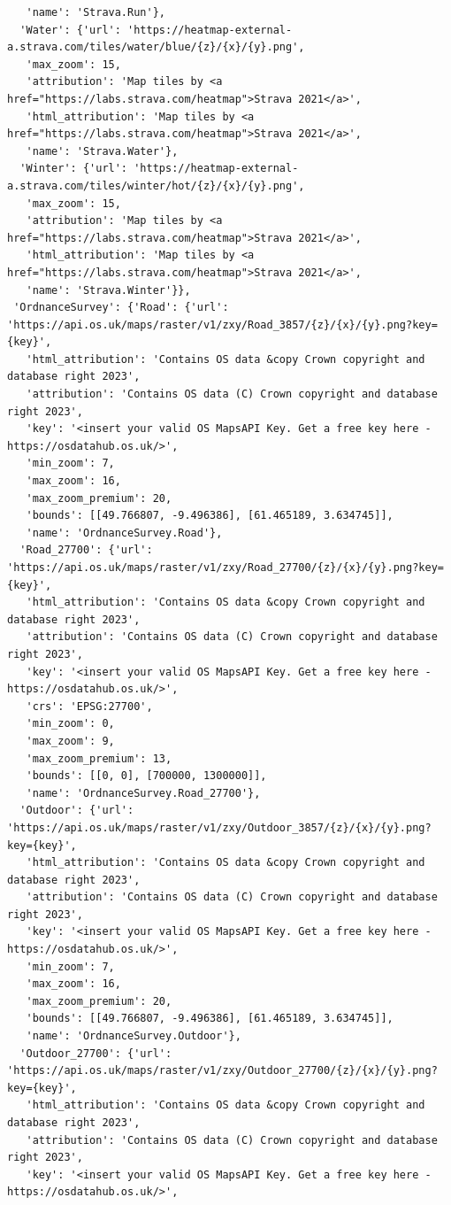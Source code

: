 \documentclass[
  letterpaper,
  DIV=11,
  numbers=noendperiod]{scrreprt}
\begin{document}
\begin{verbatim}
   'name': 'Strava.Run'},
  'Water': {'url': 'https://heatmap-external-a.strava.com/tiles/water/blue/{z}/{x}/{y}.png',
   'max_zoom': 15,
   'attribution': 'Map tiles by <a href="https://labs.strava.com/heatmap">Strava 2021</a>',
   'html_attribution': 'Map tiles by <a href="https://labs.strava.com/heatmap">Strava 2021</a>',
   'name': 'Strava.Water'},
  'Winter': {'url': 'https://heatmap-external-a.strava.com/tiles/winter/hot/{z}/{x}/{y}.png',
   'max_zoom': 15,
   'attribution': 'Map tiles by <a href="https://labs.strava.com/heatmap">Strava 2021</a>',
   'html_attribution': 'Map tiles by <a href="https://labs.strava.com/heatmap">Strava 2021</a>',
   'name': 'Strava.Winter'}},
 'OrdnanceSurvey': {'Road': {'url': 'https://api.os.uk/maps/raster/v1/zxy/Road_3857/{z}/{x}/{y}.png?key={key}',
   'html_attribution': 'Contains OS data &copy Crown copyright and database right 2023',
   'attribution': 'Contains OS data (C) Crown copyright and database right 2023',
   'key': '<insert your valid OS MapsAPI Key. Get a free key here - https://osdatahub.os.uk/>',
   'min_zoom': 7,
   'max_zoom': 16,
   'max_zoom_premium': 20,
   'bounds': [[49.766807, -9.496386], [61.465189, 3.634745]],
   'name': 'OrdnanceSurvey.Road'},
  'Road_27700': {'url': 'https://api.os.uk/maps/raster/v1/zxy/Road_27700/{z}/{x}/{y}.png?key={key}',
   'html_attribution': 'Contains OS data &copy Crown copyright and database right 2023',
   'attribution': 'Contains OS data (C) Crown copyright and database right 2023',
   'key': '<insert your valid OS MapsAPI Key. Get a free key here - https://osdatahub.os.uk/>',
   'crs': 'EPSG:27700',
   'min_zoom': 0,
   'max_zoom': 9,
   'max_zoom_premium': 13,
   'bounds': [[0, 0], [700000, 1300000]],
   'name': 'OrdnanceSurvey.Road_27700'},
  'Outdoor': {'url': 'https://api.os.uk/maps/raster/v1/zxy/Outdoor_3857/{z}/{x}/{y}.png?key={key}',
   'html_attribution': 'Contains OS data &copy Crown copyright and database right 2023',
   'attribution': 'Contains OS data (C) Crown copyright and database right 2023',
   'key': '<insert your valid OS MapsAPI Key. Get a free key here - https://osdatahub.os.uk/>',
   'min_zoom': 7,
   'max_zoom': 16,
   'max_zoom_premium': 20,
   'bounds': [[49.766807, -9.496386], [61.465189, 3.634745]],
   'name': 'OrdnanceSurvey.Outdoor'},
  'Outdoor_27700': {'url': 'https://api.os.uk/maps/raster/v1/zxy/Outdoor_27700/{z}/{x}/{y}.png?key={key}',
   'html_attribution': 'Contains OS data &copy Crown copyright and database right 2023',
   'attribution': 'Contains OS data (C) Crown copyright and database right 2023',
   'key': '<insert your valid OS MapsAPI Key. Get a free key here - https://osdatahub.os.uk/>',

\end{verbatim}
\end{document}
